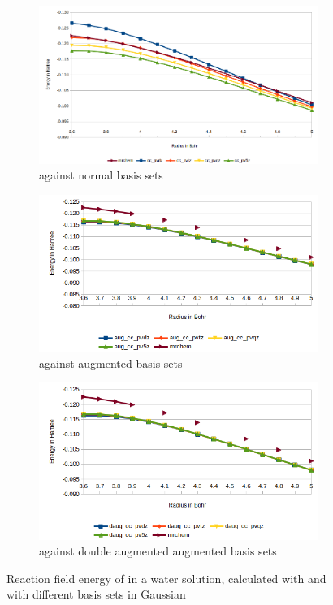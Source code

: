 \documentclass[../master_thesis.tex]{subfiles}
\begin{document}
\begin{figure}[h!]
  \centering
  \begin{subfigure}[b]{0.75\linewidth}
    \includegraphics[width=\linewidth]{img/Ercyan.png}
    \caption{\mrchem against normal basis sets}
  \end{subfigure}
  \begin{subfigure}[b]{0.75\linewidth}
    \includegraphics[width=\linewidth]{img/Eraugcyan.png}
      \caption{\mrchem against augmented basis sets}
  \end{subfigure}
  \begin{subfigure}[b]{0.75\linewidth}
    \includegraphics[width=\linewidth]{img/Erdaugcyan.png}
    \caption{\mrchem against double augmented augmented basis sets}
  \end{subfigure}
  \caption[Energy plots for ]{Reaction field energy of  in a water solution, calculated with \mrchem
  and with different basis sets in Gaussian}
  \label{fig:cyanEnergyplots}
\end{figure}
\end{document}
